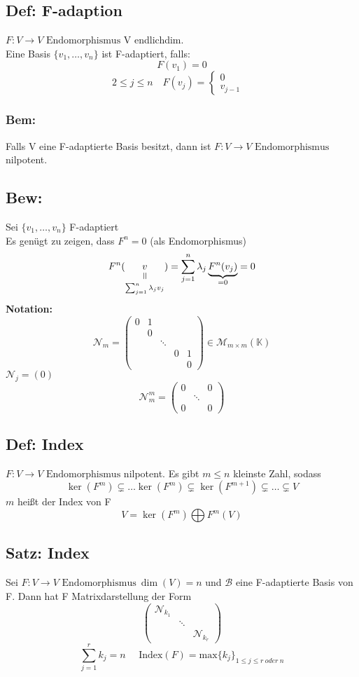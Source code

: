 \documentclass[titlepage,12pt,a4paper,ngerman]{report}
\newcommand{\verteq}{\rotatebox{90}{$\,=$}}
\newcommand{\equalto}[2]{\underset{\scriptstyle\overset{\mkern4mu\verteq}{#2}}{#1}}
\newcommand{\tx}[1]{\textrm{#1}}
\newcommand{\ub}[1]{\underbrace{#1}}
\newcommand{\casess}[4]{\left\{ \begin{array}{ll} {#1} & {#2} \\ {#3} & {#4} \end{array} \right.}
\newcommand{\enph}{F: V \to V \textrm{ Endomorphismus}}
\begin{document}


\subsection{Def: F-adaption}
$ \enph $ V endlichdim.\\
Eine Basis $ \{v_1,\dots,v_n\} $ ist F-adaptiert, falls:\\
$$F(v_1) = 0$$
$$2\le j \le n \quad F(v_j) = \casess{0}{}{v_{j-1}}{}$$
\subsubsection{Bem:}
Falls V eine F-adaptierte Basis besitzt, dann ist $ \enph $ nilpotent.
\subsection{Bew:}
Sei $ \{v_1,\dots ,v_n\} $ F-adaptiert\\
Es genügt zu zeigen, dass $ F^n = 0 $ (als Endomorphismus)
$$F^n(\equalto{v}{\sum_{j=1}^{n} \lambda_j v_j}) = \sum_{j=1}^{n} \lambda_j \ub{F^n(v_j)}_{=0} = 0$$
\textbf{Notation:}
$$ \mathcal{N}_m = \begin{pmatrix}
0 & 1 \\
& 0 \\
& & \ddots \\
& & & 0 & 1\\
& & & & 0 
\end{pmatrix} \in \mathcal{M}_{m\times m} (\mathbb{K})$$
$\mathcal{N} _j = (0) $
$$ \mathcal{N}^m_m = \begin{pmatrix}
0 & & 0 \\
& \ddots \\
0 & & 0
\end{pmatrix}$$
\subsection{Def: Index}
$ \enph $ nilpotent. Es gibt $ m \le n $ kleinste Zahl, sodass 
$$ \ker(F^m) \subsetneq \dots \ker (F^m) \subsetneq \ker(F^{m+1}) \subsetneq \dots \subsetneq V$$
$m$ heißt der Index von F
$$ V = \ker(F^m) \bigoplus F^m(V)$$
\subsection{Satz: Index}
Sei $ \enph \ \dim(V) = n $ und $ \mathcal{B} $ eine F-adaptierte Basis von F. Dann hat F Matrixdarstellung der Form
$$\begin{pmatrix}
\mathcal{N}_{k_1}\\
& \ddots \\
& & \mathcal{N}_{k_r}
\end{pmatrix}$$
$$\sum_{j=1}^{r} k_j = n \quad \tx{ Index} (F) = \tx{max} \{k_j\}_{1 \le j \le r \ oder \ n}$$
\end{document}
